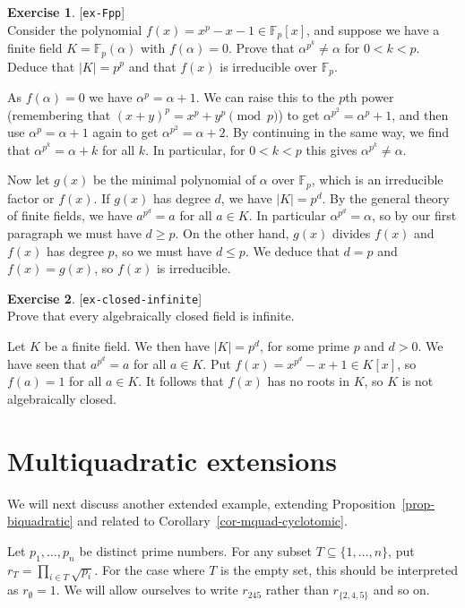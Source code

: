\documentclass{amsart}
\newcommand{\F}         {{\mathbb{F}}}
\newcommand{\al}        {\alpha}
\newcommand{\sse}       {\subseteq}
\renewcommand{\:}{\colon}
\newcommand{\lastexlabel}{}
\newcommand{\exlabel}[1]{
 \global\def\lastexlabel{#1}\label{#1}[\texttt{#1}]\ \\
}
\newcommand{\exlabel}[1]{
 \global\def\lastexlabel{#1}\label{#1}
}
\newenvironment{solution}{\SolutionInline}{\endSolutionInline}
\theoremstyle{definition}
\newtheorem{exercise}{Exercise}[section]
\renewenvironment{solution}{\SolutionAtEnd}{\endSolutionAtEnd}
\begin{document}
\begin{exercise}\exlabel{ex-Fpp}
 Consider the polynomial $f(x)=x^p-x-1\in\F_p[x]$, and suppose we have
 a finite field $K=\F_p(\al)$ with $f(\al)=0$.  Prove that
 $\al^{p^k}\neq\al$ for $0<k<p$.  Deduce that $|K|=p^p$ and that
 $f(x)$ is irreducible over $\F_p$.
\end{exercise}
\begin{solution}
 As $f(\al)=0$ we have $\al^p=\al+1$.  We can raise this to the $p$th
 power (remembering that $(x+y)^p=x^p+y^p\pmod{p}$) to get
 $\al^{p^2}=\al^p+1$, and then use $\al^p=\al+1$ again to get
 $\al^{p^2}=\al+2$.  By continuing in the same way, we find that
 $\al^{p^k}=\al+k$ for all $k$.  In particular, for $0<k<p$ this gives
 $\al^{p^k}\neq\al$.  

 Now let $g(x)$ be the minimal polynomial of $\al$ over $\F_p$, which
 is an irreducible factor or $f(x)$.  If $g(x)$ has degree $d$, we
 have $|K|=p^d$.  By the general theory of finite fields, we have
 $a^{p^d}=a$ for all $a\in K$.  In particular $\al^{p^d}=\al$, so by
 our first paragraph we must have $d\geq p$.  On the other hand,
 $g(x)$ divides $f(x)$ and $f(x)$ has degree $p$, so we must have
 $d\leq p$.  We deduce that $d=p$ and $f(x)=g(x)$, so $f(x)$ is
 irreducible. 
\end{solution}

\begin{exercise}\exlabel{ex-closed-infinite}
 Prove that every algebraically closed field is infinite.
\end{exercise}
\begin{solution}
 Let $K$ be a finite field.  We then have $|K|=p^d$, for some prime
 $p$ and $d>0$.  We have seen that $a^{p^d}=a$ for all $a\in K$.  Put
 $f(x)=x^{p^d}-x+1\in K[x]$, so $f(a)=1$ for all $a\in K$.  It follows
 that $f(x)$ has no roots in $K$, so $K$ is not algebraically closed. 
\end{solution}

\section{Multiquadratic extensions}
\label{sec-mquad}

We will next discuss another extended example, extending
Proposition~\ref{prop-biquadratic} and related to
Corollary~\ref{cor-mquad-cyclotomic}.  

Let $p_1,\dotsc,p_n$ be distinct prime numbers.  For any subset
$T\sse\{1,\dotsc,n\}$, put $r_T=\prod_{i\in T}\sqrt{p_i}$.  For the
case where $T$ is the empty set, this should be interpreted as
$r_\emptyset=1$.  We will allow ourselves to write 
$r_{245}$ rather than $r_{\{2,4,5\}}$ and so on.
\end{document}
